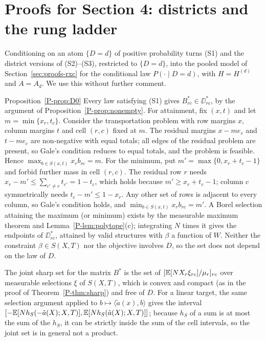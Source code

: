 \section{Proofs for Section 4: districts and the rung ladder}\label{sec:proofs-districts}

Conditioning on an atom $\{D=d\}$ of positive probability turns (S1) and the district
versions of (S2)--(S3), restricted to $\{D=d\}$, into the pooled model of
Section~\ref{sec:proofs-rxc} for the conditional law $P(\cdot\mid D=d)$, with
$H=H^{(d)}$ and $A=A_d$. We use this without further comment.

\begin{proofof}{Proposition~\ref{P-prop:D0}}
Every law satisfying (S1) gives $B^*_{rc}\in\DD^*_{rc}$, by the argument of
Proposition~\ref{P-prop:nonempty}. For attainment, fix $(x,t)$ and let
$m=\min\{x_r,t_c\}$. Consider the transportation problem with row margins $x$, column
margins $t$ and cell $(r,c)$ fixed at $m$. The residual margins $x-me_r$ and $t-me_c$
are non-negative with equal totals; all edges of the residual problem are present,
so Gale's condition reduces to equal totals, and the problem is feasible. Hence
$\max_{b\in S(x,t)}x_rb_{rc}=m$. For the minimum, put $m'=\max\{0,x_r+t_c-1\}$ and
forbid further mass in cell $(r,c)$. The residual row $r$ needs
$x_r-m'\le\sum_{c'\ne c}t_{c'}=1-t_c$, which holds because $m'\ge x_r+t_c-1$; column
$c$ symmetrically needs $t_c-m'\le1-x_r$. Any other set of rows is adjacent to every
column, so Gale's condition holds, and $\min_{b\in S(x,t)}x_rb_{rc}=m'$. A Borel
selection attaining the maximum (or minimum) exists by the measurable maximum theorem
and Lemma~\ref{P-lem:polytope}(c); integrating $N$ times it gives the endpoints of
$\DD^*_{rc}$, attained by valid structures with $\beta$ a function of $W$. Neither the
constraint $\beta\in S(X,T)$ nor the objective involves $D$, so the set does not
depend on the law of $D$.

The joint sharp set for the matrix $B^*$ is the set of
$[\mathbb E[NX_r\xi_{rc}]/\mu_r]_{rc}$ over measurable selections $\xi$ of $S(X,T)$, which is
convex and compact (as in the proof of Theorem~\ref{P-thm:sharp}) and free of $D$. For a
linear target, the same selection argument applied to $b\mapsto\langle\tilde
a(x),b\rangle$ gives the interval
$[-\mathbb E[Nh_S(-\tilde a(X);X,T)],\mathbb E[Nh_S(\tilde a(X);X,T)]]$; because $h_S$ of a sum is at
most the sum of the $h_S$, it can be strictly inside the sum of the cell intervals, so
the joint set is in general not a product.
\end{proofof}

